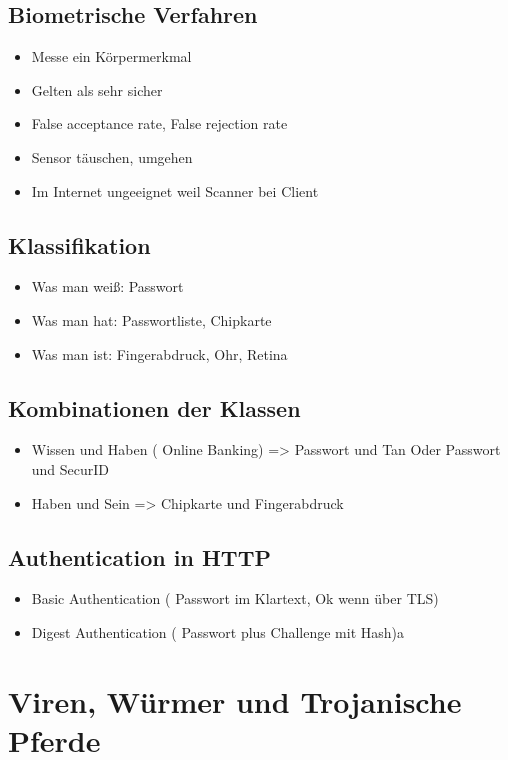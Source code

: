 \subsection*{ Biometrische Verfahren}
\begin{itemize}
	\item Messe ein Körpermerkmal
	\item Gelten als sehr sicher
	\item False acceptance rate, False rejection rate
	\item Sensor täuschen, umgehen
	\item Im Internet ungeeignet weil Scanner bei Client
\end{itemize}

\subsection*{ Klassifikation}
\begin{itemize}
	\item Was man weiß: Passwort
	\item Was man hat: Passwortliste, Chipkarte
	\item Was man ist: Fingerabdruck, Ohr, Retina
\end{itemize}

\subsection*{ Kombinationen der Klassen}
\begin{itemize}
	\item Wissen und Haben ( Online Banking) => Passwort und Tan Oder Passwort und SecurID
	\item Haben und Sein => Chipkarte und Fingerabdruck
\end{itemize}

\subsection*{ Authentication in HTTP}
\begin{itemize}
	\item Basic Authentication ( Passwort im Klartext, Ok wenn über TLS)
	\item Digest Authentication ( Passwort plus Challenge mit Hash)a
\end{itemize}




\section*{Viren, Würmer und Trojanische Pferde}

